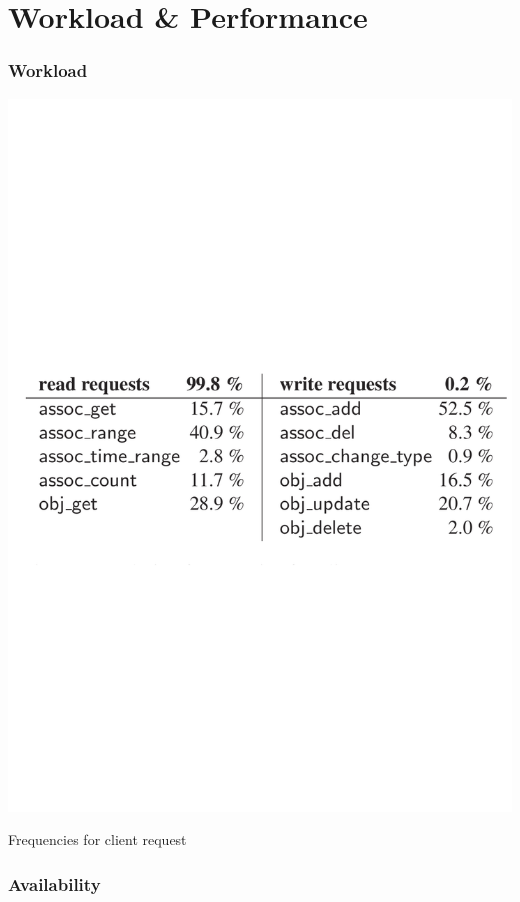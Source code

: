 \section{Workload \& Performance}
\begin{frame}[c]\frametitle{Workload}
\centering
\includegraphics[width=\textwidth]{figs/table3.pdf} 

Frequencies for client request



\end{frame}

\begin{frame}[c]\frametitle{Availability}


\end{frame}


